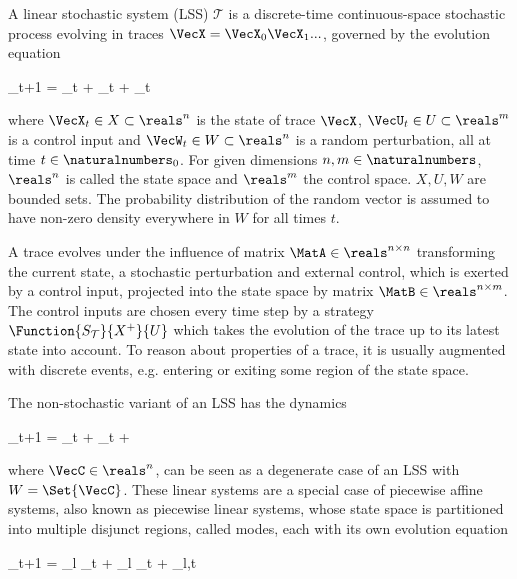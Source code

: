 \startsubsection[title={Linear Stochastic Systems},reference=sec:theory-hybrids-lss]

    A linear stochastic system (LSS) $\mathcal{T}$ is a discrete-time continuous-space stochastic process evolving in traces $\VecX = \VecX_0 \VecX_1 ...$, governed by the evolution equation

    \startformula
        \VecX_{t+1} = \MatA \VecX_t + \MatB \VecU_t + \VecW_t \EndComma
    \stopformula

    where $\VecX_t \in X \subset \reals^n$ is the state of trace $\VecX$,
    $\VecU_t \in U \subset \reals^m$ is a control input and
    $\VecW_t \in W \subset \reals^n$ is a random perturbation, all at time $t \in \naturalnumbers_0$.
    For given dimensions $n, m \in \naturalnumbers$, $\reals^n$ is called the state space and $\reals^m$ the control space.
    $X, U, W$ are bounded sets.
    The probability distribution of the random vector is assumed to have non-zero density everywhere in $W$ for all times $t$.

    A trace evolves under the influence of matrix $\MatA \in \reals^{n \times n}$ transforming the current state, a stochastic perturbation and external control, which is exerted by a control input, projected into the state space by matrix $\MatB \in \reals^{n \times m}$.
    The control inputs are chosen every time step by a strategy $\Function{S_\mathcal{T}}{X^+}{U}$ which takes the evolution of the trace up to its latest state into account.
    To reason about properties of a trace, it is usually augmented with discrete events, e.g. entering or exiting some region of the state space.

\stopsubsection


\startsubsection[title={Related Systems}]

    The non-stochastic variant of an LSS has the dynamics

    \startformula
        \VecX_{t+1} = \MatA \VecX_t + \MatB \VecU_t + \VecC \EndComma
    \stopformula

    where $\VecC \in \reals^n$, can be seen as a degenerate case of an LSS with $W = \Set{\VecC}$.
    These linear systems are a special case of piecewise affine systems, also known as piecewise linear systems, whose state space is partitioned into multiple disjunct regions, called modes, each with its own evolution equation

    \startformula
        \VecX_{t+1} = \MatA_l \VecX_t + \MatB_l \VecU_t + \VecW_{l,t} \EndComma
    \stopformula

